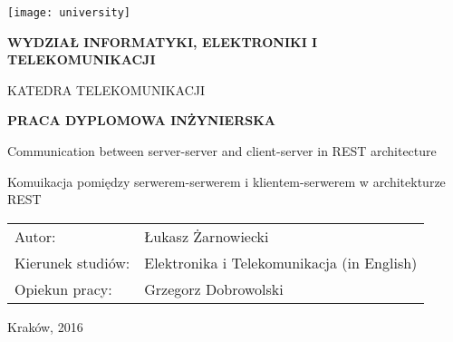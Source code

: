 \begin{titlepage}
    \begin{center}
        \texttt{[image: university]}

        \vspace*{1cm}
        \textbf{\uppercase{Wydział Informatyki, Elektroniki i Telekomunikacji}}

        \small
        \vspace*{0.5cm}
        \uppercase{Katedra Telekomunikacji}

        \vspace{2cm}
        \large
        \textbf{PRACA DYPLOMOWA INŻYNIERSKA}

        \vspace{2cm}
        \Large
        Communication between server-server and client-server in REST architecture

        \normalsize
        \vspace{1cm}
        Komuikacja pomiędzy serwerem-serwerem i klientem-serwerem w architekturze REST

        \small
        \vspace{2cm}
        \begin{flushleft}
            \begin{tabular}{p{5cm}l}
            Autor: & Łukasz Żarnowiecki \\
            Kierunek studiów: & Elektronika i Telekomunikacja (in English) \\
            Opiekun pracy: & Grzegorz Dobrowolski
            \end{tabular}
        \end{flushleft}

        \vfill
        Kraków, 2016

    \end{center}
\end{titlepage}
